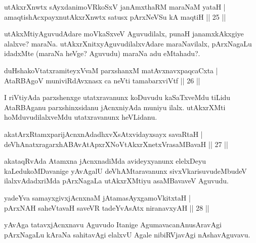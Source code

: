 
\begin{shl}
utAkxrXnwtx sAyxdanimoVRkoSxV janAmxthaRM maraNaM yataH |\\
amaqtishAcxpayxnutAkxrXnwtx satusx pArxNeVSu kA maqtiH \hfill || 25 ||
\end{shl}

\begin{artha}
utAkxMtiyAguvudAdare moVkaSxveV Aguvudilalx, punaH janamxkAkxgiye alalxve? maraNa. 
utAkxrXnitxyAguvudilalxvAdare maraNavilalx, pArxNagaLu idadxMte (maraNa heVge? Aguvudu) 
maraNa adu eMtahadu?.
\end{artha}

\begin{shl}
duHshakoVtatxramiteyxVvaM parxshanxM matAvx\s navxpaqcaCxta |\\
AtaRBAgoV muniviRdAvxnasx ca neVti tamabarxviVtf \hfill || 26 ||
\end{shl}

\begin{artha}
I riVtiyAda parxshenxge utatxravanunx koDuvudu kaSaTxveMdu tiLidu AtaRBAganu 
parxshinxsidanu jAcnxniyAda muniyu ilalx. utAkxrXMti hoMduvudilalxveMdu utatxravanunx 
heVLidanu.
\end{artha}

\begin{shl}
akatArxRtamxparijAcnxnAdadhxvXsAtxvidayxsayx savaRtaH |\\
deVhAnatxragarxhABAvAtApxrXNoVtAkxrXnetxVrasaMBavaH \hfill || 27 ||
\end{shl}

\begin{artha}
akataqRvAda Atamxna jAcnxnadiMda avideyxyanunx elelxDeyu kaLedukoMDavanige yAvAgalU deVhAMtaravanunx sivxVkarisuvudeMbudeV ilalxvAdadxriMda pArxNagaLa utAkxrXMtiyu asaMBavaveV Aguvudu.
\end{artha}

\begin{shl}
yadeYva samayxgivxjAcnxnaM jAtamasAyx\s \s gamoVkitxtaH |\\
pArxNAH saheVtavaH saveVR tadeYvAsAtx niranavxyAH \hfill || 28 ||
\end{shl}

\begin{artha}
yAvAga tatavxjAcnxnavu Aguvudo Itanige AgumavacanAnusAravAgi pArxNagaLu kAraNa sahitavAgi elalxvU Agale nibiRVjavAgi nAshavAguvavu.
\end{artha}

